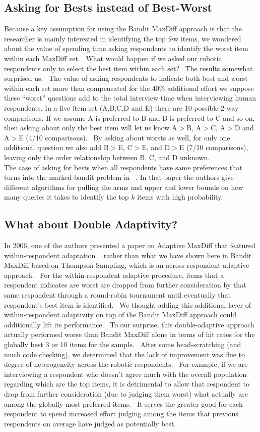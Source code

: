 \documentclass[nonblindrev]{informs3}
\begin{document}
\subsection{Asking for Bests instead of Best-Worst}
Because a key assumption for using the Bandit MaxDiff approach is that the researcher is mainly interested in identifying the top few items, we wondered about the value of spending time asking respondents to identify the worst item within each MaxDiff set.  What would happen if we asked our robotic respondents only to select the best item within each set?  The results somewhat surprised us.  The value of asking respondents to indicate both best and worst within each set more than compensated for the 40\% additional effort we suppose these ``worst'' questions add to the total interview time when interviewing human respondents.
In a five item set (A,B,C,D and E) there are 10 possible 2-way comparisons. If we assume A is preferred to B and B is preferred to C and so on, then asking about only the best item will let us know A$>$B, A$>$C, A$>$D and A$>$E (4/10 comparisons).  By asking about worsts as well, for only one additional question we also add B$>$E, C$>$E, and D$>$E (7/10 comparisons), leaving only the order relationship between B, C, and D unknown.\\
The case of asking for bests when all respondents have same preferences that turns into the marked-bandit problem in ~\cite{simchowitz2016best}. In that paper the authors give different algorithms for pulling the arms and upper and lower bounds on how many queries it takes to identify the top $k$ items with high probability. 
\subsection{What about Double Adaptivity?}
In 2006, one of the authors presented a paper on Adaptive MaxDiff that featured within-respondent adaptation ~\cite{orme2006adaptive} rather than what we have shown here in Bandit MaxDiff based on Thompson Sampling, which is an across-respondent adaptive approach.  For the within-respondent adaptive procedure, items that a respondent indicates are worst are dropped from further consideration by that same respondent through a round-robin tournament until eventually that respondent's best item is identified.  We thought adding this additional layer of within-respondent adaptivity on top of the Bandit MaxDiff approach could additionally lift its performance.  To our surprise, this double-adaptive approach actually performed worse than Bandit MaxDiff alone in terms of hit rates for the globally best 3 or 10 items for the sample.  After some head-scratching (and much code checking), we determined that the lack of improvement was due to degree of heterogeneity across the robotic respondents.  For example, if we are interviewing a respondent who doesn't agree much with the overall population regarding which are the top items, it is detrimental to allow that respondent to drop from further consideration (due to judging them worst) what actually are among the globally most preferred items.  It serves the greater good for each respondent to spend increased effort judging among the items that previous respondents on average have judged as potentially best.
\end{document}
